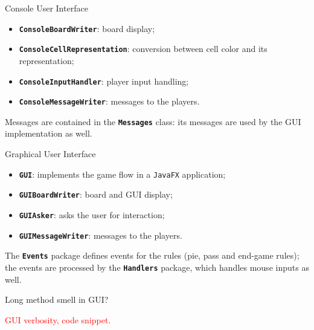 \documentclass{beamer}
\begin{document}
  \begin{frame}{Console User Interface}

    \begin{itemize}
      \setlength\itemsep{1em}
      \item \textbf{\texttt{ConsoleBoardWriter}}: board display;
      \item \textbf{\texttt{ConsoleCellRepresentation}}: conversion between cell color and its representation;
      \item \textbf{\texttt{ConsoleInputHandler}}: player input handling;
      \item \textbf{\texttt{ConsoleMessageWriter}}: messages to the players.
    \end{itemize}

    \vspace{1em}

    Messages are contained in the \textbf{\texttt{Messages}} class: its messages are used by the GUI implementation as well.

  \end{frame}



  \begin{frame}{Graphical User Interface}

    \begin{itemize}
      \setlength\itemsep{1em}
      \item \textbf{\texttt{GUI}}: implements the game flow in a \texttt{JavaFX} application;
      \item \textbf{\texttt{GUIBoardWriter}}: board and GUI display;
      \item \textbf{\texttt{GUIAsker}}: asks the user for interaction;
      \item \textbf{\texttt{GUIMessageWriter}}: messages to the players.
    \end{itemize}

    \vspace{1em}

    The \textbf{\texttt{Events}} package defines events for the rules (pie, pass and end-game rules); the events are processed by the \textbf{\texttt{Handlers}} package, which handles mouse inputs as well.

  \end{frame}



  \begin{frame}{Long method smell in GUI?}

    \textcolor{red}{GUI verbosity, code snippet.}

  \end{frame}
\end{document}
